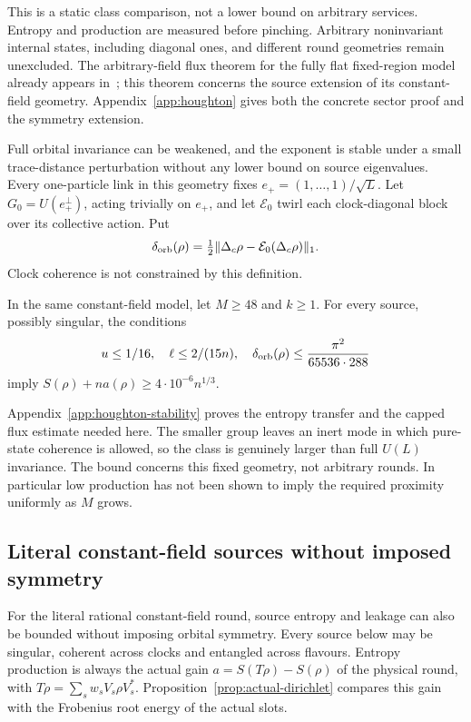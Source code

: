 This is a static class comparison, not a lower bound on arbitrary
services. Entropy and production are measured before pinching.
Arbitrary noninvariant internal states, including diagonal ones, and
different round geometries remain unexcluded. The arbitrary-field
flux theorem for the fully flat fixed-region model already appears
in~\cite[Section~6.2]{DouglasMghirbiA}; this theorem concerns the source
extension of its constant-field geometry. Appendix~\ref{app:houghton}
gives both the concrete sector proof and the symmetry extension.

Full orbital invariance can be weakened, and the exponent is stable
under a small trace-distance perturbation without any lower bound on
source eigenvalues. Every one-particle link in this geometry fixes
$e_+=(1,\ldots,1)/\sqrt L$. Let $G_0=U(e_+^\perp)$, acting trivially
on $e_+$, and let $\mathcal E_0$ twirl each clock-diagonal block over
its collective action. Put
\[
 \delta_{\rm orb}(\rho)=\tfrac12
       \|\Delta_c\rho-\mathcal E_0(\Delta_c\rho)\|_1.
\]
Clock coherence is not constrained by this definition.

\begin{theorem}\label{thm:houghton-stability}
In the same constant-field model, let $M\geq48$ and $k\geq1$.
For every source, possibly singular, the conditions
\[
 u\leq1/16,\quad \ell\leq2/(15n),\quad
 \delta_{\rm orb}(\rho)\leq\frac{\pi^2}{65536\cdot288}
\]
imply $S(\rho)+na(\rho)\geq4\cdot10^{-6}n^{1/3}$.
\end{theorem}

Appendix~\ref{app:houghton-stability} proves the entropy transfer and
the capped flux estimate needed here. The smaller group leaves an
inert mode in which pure-state coherence is allowed, so the class is
genuinely larger than full $U(L)$ invariance. The bound concerns this
fixed geometry, not arbitrary rounds. In particular low production
has not been shown to imply the required proximity uniformly as $M$
grows.

\subsection{Literal constant-field sources without imposed symmetry}

For the literal rational constant-field round, source entropy and
leakage can also be bounded without imposing orbital symmetry.
Every source below may be singular, coherent across clocks and
entangled across flavours. Entropy production is always the actual
gain $a=S(T\rho)-S(\rho)$ of the physical round, with
$T\rho=\sum_sw_sV_s\rho V_s^*$.
Proposition~\ref{prop:actual-dirichlet} compares this gain with the
Frobenius root energy of the actual slots.

